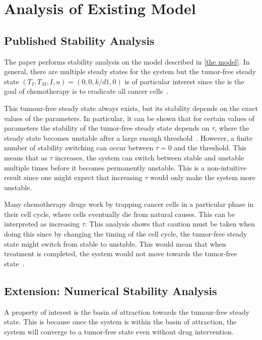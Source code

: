 \chapter{Analysis of Existing Model}

\section{Published Stability Analysis}

The paper performs stability analysis on the model described in \ref{the model}. In general, there are multiple steady states for the system but the tumor-free steady state $(T_I, T_M, I, u) = (0, 0, k/d1, 0)$ is of particular interest since the is the goal of chemotherapy is to eradicate all cancer cells~\cite{villasana2003}.

This tumour-free steady state always exists, but its stability depends on the exact values of the parameters. In particular, it can be shown that for certain values of parameters the stability of the tumor-free steady state depends on $\tau$, where the steady state becomes unstable after a large enough threshold~\cite{villasana2003}. However, a finite number of stability switching can occur between $\tau = 0$ and the threshold. This means that as $\tau$ increases, the system can switch between stable and unstable multiple times before it becomes permanently unstable. This is a non-intuitive result since one might expect that increasing $\tau$ would only make the system more unstable.


Many chemotherapy drugs work by trapping cancer cells in a particular phase in their cell cycle, where cells eventually die from natural causes. This can be interpreted as increasing $\tau$. This analysis shows that caution must be taken when doing this since by changing the timing of the cell cycle, the tumor-free steady state might switch from stable to unstable. This would mean that when treatment is completed, the system would not move towards the tumor-free state~\cite{villasana2003}. 

\section{Extension: Numerical Stability Analysis}
\label{numerical stability analysis}

A property of interest is the basin of attraction towards the tumour-free steady state. This is because once the system is within the \gls{basin of attraction}, the system will converge to a tumor-free state even without drug intervention.

